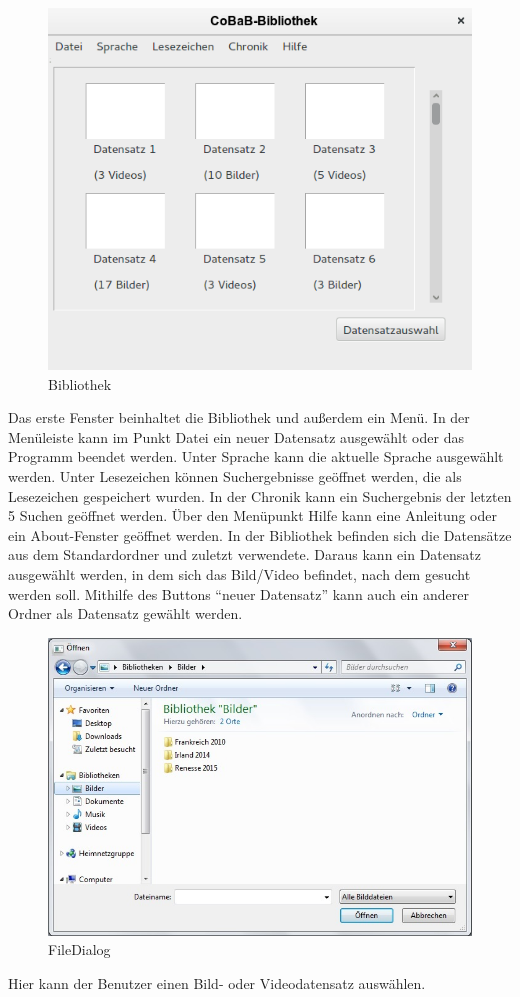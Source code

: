 \begin{figure}[H]
\includegraphics[width=1\linewidth]{img/Bibliothek2}
\caption{Bibliothek}
\label{fig:bibliothek}
\end{figure}
Das erste Fenster beinhaltet die Bibliothek und außerdem ein Menü. In der Menüleiste kann im Punkt Datei ein neuer Datensatz ausgewählt oder das Programm beendet werden.  Unter Sprache kann die aktuelle Sprache ausgewählt werden. Unter Lesezeichen können Suchergebnisse geöffnet werden, die als Lesezeichen gespeichert wurden. In der Chronik kann ein Suchergebnis der letzten 5 Suchen geöffnet werden. Über den Menüpunkt Hilfe kann eine Anleitung oder ein About-Fenster geöffnet werden.
In der Bibliothek befinden sich die Datensätze aus dem Standardordner und zuletzt verwendete. Daraus kann ein Datensatz ausgewählt werden, in dem sich das Bild/Video befindet, nach dem gesucht werden soll. Mithilfe des Buttons \enquote{neuer Datensatz} kann auch ein anderer Ordner als Datensatz gewählt werden.

\begin{figure}[H]
\includegraphics[width=1\linewidth]{img/FileChooser}
\caption{FileDialog}
\label{fig:filedialog}
\end{figure}
Hier kann der Benutzer einen Bild- oder Videodatensatz auswählen.


